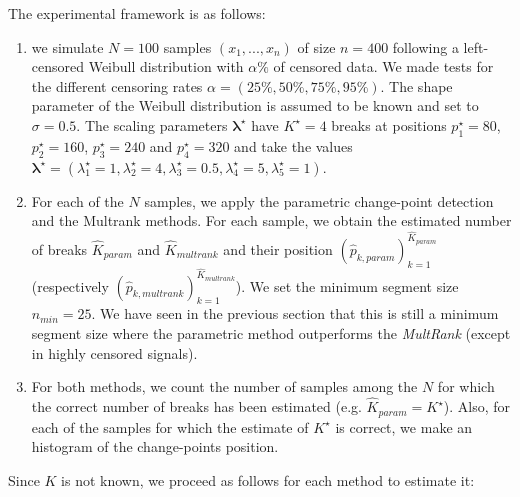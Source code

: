 The experimental framework is as follows: 
    \begin{enumerate}
        \item we simulate $N=100$ samples $(x_1,...,x_n)$ of size $n=400$  following a left-censored Weibull distribution with $\alpha\%$ of censored data. We made tests for the different censoring rates $\alpha = (25\%,50\%,75\%,95\%)$. The shape parameter of the Weibull distribution is assumed to be known and set to $\sigma=0.5$. The scaling parameters $\bm{\lambda^\star}$ have $K^\star=4$ breaks at positions $p^\star_1 = 80$, $p^\star_2 = 160$, $p^\star_3 = 240$ and $p^\star_4 = 320$ and take the values $\bm{\lambda^\star}=(\lambda^\star_1 = 1, \lambda^\star_2 = 4, \lambda^\star_3 = 0.5, \lambda^\star_4 = 5, \lambda^\star_5 = 1)$. 
        \item For each of the $N$ samples, we apply the parametric change-point detection and the Multrank methods. For each sample, we obtain the estimated number of breaks $\hat K_{param}$ and $\hat K_{multrank}$ and their position $(\hat{p}_{k,param})_{k = 1}^{\hat K_{param}}$ (respectively $(\hat{p}_{k,multrank})_{k = 1}^{\hat K_{multrank}}$). We set the minimum segment size $n_{min} =  25$. We have seen in the previous section that this is still a minimum segment size where the parametric method outperforms the \textit{MultRank} (except in highly censored signals).    
        \item For both methods, we count the number of samples among the $N$ for which the correct number of breaks has been estimated (e.g. $\hat K_{param} = K^\star$). Also, for each of the samples for which the estimate of $K^\star$ is correct, we make an histogram of the change-points position. 
    \end{enumerate}
Since $K$ is not known, we proceed as follows for each method to estimate it:
